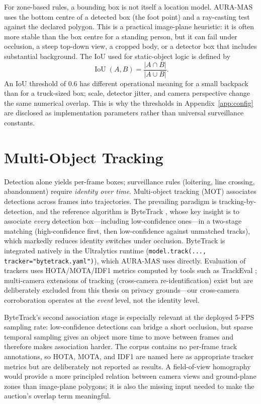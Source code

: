 For zone-based rules, a bounding box is not itself a location model. AURA-MAS
uses the bottom centre of a detected box (the foot point) and a ray-casting
test against the declared polygon. This is a practical image-plane heuristic:
it is often more stable than the box centre for a standing person, but it can
fail under occlusion, a steep top-down view, a cropped body, or a detector box
that includes substantial background. The IoU used for static-object logic is
defined by
\[
\operatorname{IoU}(A,B)=\frac{|A\cap B|}{|A\cup B|}.
\]
An IoU threshold of 0.6 has different operational meaning for a small backpack
than for a truck-sized box; scale, detector jitter, and camera perspective
change the same numerical overlap. This is why the thresholds in
Appendix~\ref{app:config} are disclosed as implementation parameters rather
than universal surveillance constants.

\section{Multi-Object Tracking}

Detection alone yields per-frame boxes; surveillance rules (loitering, line crossing, abandonment) require \emph{identity over time}. Multi-object tracking (MOT) associates detections across frames into trajectories. The prevailing paradigm is tracking-by-detection, and the reference algorithm is ByteTrack \cite{zhang2022bytetrack}, whose key insight is to associate \emph{every} detection box---including low-confidence ones---in a two-stage matching (high-confidence first, then low-confidence against unmatched tracks), which markedly reduces identity switches under occlusion. ByteTrack is integrated natively in the Ultralytics runtime (\texttt{model.track(..., tracker="bytetrack.yaml")}), which AURA-MAS uses directly. Evaluation of trackers uses HOTA/MOTA/IDF1 metrics computed by tools such as TrackEval \cite{luiten2020trackeval, mendez2024metrics}; multi-camera extensions of tracking (cross-camera re-identification) exist \cite{amosa2023multicamera, fei2023momct} but are deliberately excluded from this thesis on privacy grounds---our cross-camera corroboration operates at the \emph{event} level, not the identity level.

ByteTrack's second association stage is especially relevant at the deployed
5-FPS sampling rate: low-confidence detections can bridge a short occlusion,
but sparse temporal sampling gives an object more time to move between frames
and therefore makes association harder. The corpus contains no per-frame track
annotations, so HOTA, MOTA, and IDF1 are named here as appropriate tracker
metrics but are deliberately not reported as results. A field-of-view
homography would provide a more principled relation between camera views and
ground-plane zones than image-plane polygons; it is also the missing input
needed to make the auction's overlap term meaningful.

